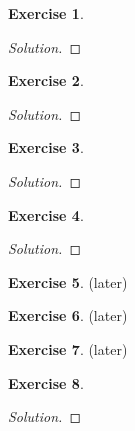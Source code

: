\documentclass[12pt,a4]{article}
\theoremstyle{definition}
\newtheorem{exercise}{Exercise}
\begin{document}
\begin{exercise}
	
\end{exercise}
\begin{proof}[Solution]
	
\end{proof}

\begin{exercise}
	
\end{exercise}
\begin{proof}[Solution]
	
\end{proof}

\begin{exercise}
	
\end{exercise}
\begin{proof}[Solution]
	
\end{proof}

\begin{exercise}
	
\end{exercise}
\begin{proof}[Solution]
	
\end{proof}

\begin{exercise}
	(later)
\end{exercise}

\begin{exercise}
	(later)
\end{exercise}

\begin{exercise}
	(later)
\end{exercise}

\begin{exercise}
	
\end{exercise}
\begin{proof}[Solution]
	
\end{proof}
\end{document}
